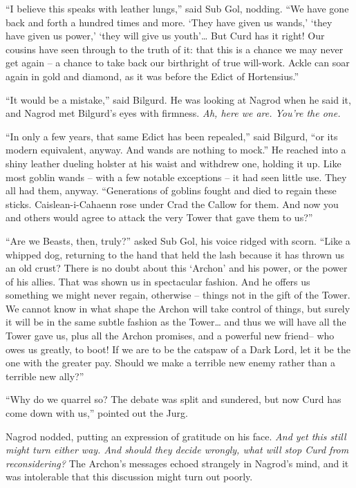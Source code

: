 ``I believe this speaks with leather lungs,'' said Sub Gol, nodding.
``We have gone back and forth a hundred times and more. `They have given
us wands,' `they have given us power,' `they will give us youth'\ldots{}
But Curd has it right! Our cousins have seen through to the truth of it:
that this is a chance we may never get again -- a chance to take back
our birthright of true will-work. Ackle can soar again in gold and
diamond, as it was before the Edict of Hortensius.''

``It would be a mistake,'' said Bilgurd. He was looking at Nagrod when
he said it, and Nagrod met Bilgurd's eyes with firmness. \emph{Ah, here
we are. You're the one.}

``In only a few years, that same Edict has been repealed,'' said
Bilgurd, ``or its modern equivalent, anyway. And wands are nothing to
mock.'' He reached into a shiny leather dueling holster at his waist and
withdrew one, holding it up. Like most goblin wands -- with a few
notable exceptions -- it had seen little use. They all had them, anyway.
``Generations of goblins fought and died to regain these sticks.
Caislean-i-Cahaenn rose under Crad the Callow for them. And now you and
others would agree to attack the very Tower that gave them to us?''

``Are we Beasts, then, truly?'' asked Sub Gol, his voice ridged with
scorn. ``Like a whipped dog, returning to the hand that held the lash
because it has thrown us an old crust? There is no doubt about this
`Archon' and his power, or the power of his allies. That was shown us in
spectacular fashion. And he offers us something we might never regain,
otherwise -- things not in the gift of the Tower. We cannot know in what
shape the Archon will take control of things, but surely it will be in
the same subtle fashion as the Tower\ldots{} and thus we will have all
the Tower gave us, plus all the Archon promises, and a powerful new
friend-- who owes us greatly, to boot! If we are to be the catspaw of a
Dark Lord, let it be the one with the greater pay. Should we make a
terrible new enemy rather than a terrible new ally?''

``Why do we quarrel so? The debate was split and sundered, but now Curd
has come down with us,'' pointed out the Jurg.

Nagrod nodded, putting an expression of gratitude on his face. \emph{And
yet this still might turn either way. And should they decide wrongly,
what will stop Curd from reconsidering?} The Archon's messages echoed
strangely in Nagrod's mind, and it was intolerable that this discussion
might turn out poorly.

